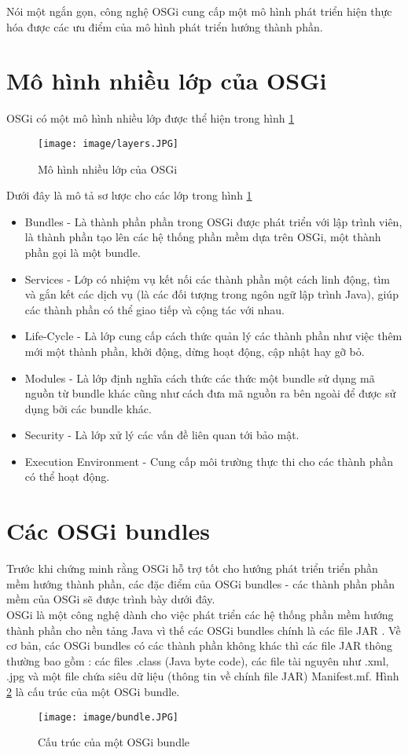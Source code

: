 Nói một ngắn gọn, công nghệ OSGi cung cấp một mô hình phát triển hiện thực hóa được các ưu điểm của mô hình phát triển hướng thành phần.

\section{Mô hình nhiều lớp của OSGi}

OSGi có một mô hình nhiều lớp \cite[p.~215]{whatisosgi} được thể hiện trong hình \ref{fig:layers}
\begin{figure}[htbp]
	\centering
		\texttt{[image: image/layers.JPG]}
	\caption{Mô hình nhiều lớp của OSGi}
	\label{fig:layers}
\end{figure}


Dưới đây là mô tả sơ lược cho các lớp trong hình \ref{fig:layers}
\begin{itemize}
	\item Bundles - Là thành phần phần trong OSGi được phát triển với lập trình viên, là thành phần tạo lên các hệ thống phần mềm dựa trên OSGi, một thành phần gọi là một bundle.
	\item Services - Lớp có nhiệm vụ kết nối các thành phần một cách linh động, tìm và gắn kết các dịch vụ (là các đối tượng trong ngôn ngữ lập trình Java),  giúp các thành phần có thể giao tiếp và cộng tác với nhau.
	\item Life-Cycle - Là lớp cung cấp cách thức quản lý các thành phần như việc thêm mới một thành phần, khởi động, dừng hoạt động, cập nhật hay gỡ bỏ.
	\item Modules - Là lớp định nghĩa cách thức các thức một bundle sử dụng mã nguồn từ bundle khác cũng như cách đưa mã nguồn ra bên ngoài để được sử dụng bởi các bundle khác. 	
	\item  Security - Là lớp xử lý các vấn đề liên quan tới bảo mật.
	\item  Execution Environment - Cung cấp môi trường thực thi cho các thành phần có thể hoạt động.
\end{itemize}

\section{Các OSGi bundles}
Trước khi chứng minh rằng OSGi hỗ trợ tốt cho hướng phát triển triển phần mềm hướng thành phần, các đặc điểm của OSGi bundles - các thành phần phần mềm của OSGi sẽ được trình bày dưới đây. \\

OSGi là một công nghệ dành cho việc phát triển các hệ thống phần mềm hướng thành phần cho nền tảng Java vì thế các OSGi bundles chính là các file JAR \cite{jar}. Về cơ bản, các OSGi bundles có các thành phần không khác thì các file JAR thông thường bao gồm : các files .class (Java byte code), các file tài nguyên như .xml, .jpg và một file chứa siêu dữ liệu (thông tin về chính file JAR) Manifest.mf. Hình \ref{fig:bundle} là cấu trúc của một OSGi bundle.
\begin{figure}[htbp]
	\centering
		\texttt{[image: image/bundle.JPG]}
	\caption{Cấu trúc của một OSGi bundle}
	\label{fig:bundle}
\end{figure}
 
